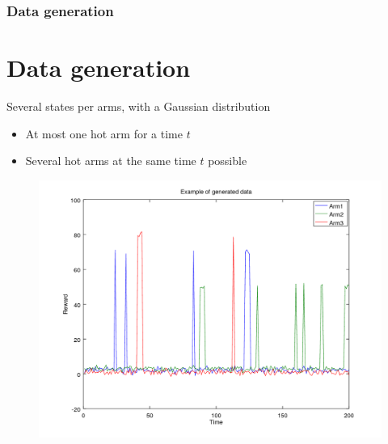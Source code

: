 \documentclass[french]{beamer}
\begin{document}
	\begin{frame}
	\frametitle{Data generation}
	\section{Data generation}
	Several states per arms, with a Gaussian distribution
	\begin{itemize}
		\item At most one hot arm for a time $t$
		\item Several hot arms at the same time $t$ possible
	\end{itemize}
	
	\begin{figure}[h]
			\includegraphics[width=0.7\linewidth]{generated_data_one.png}

		\label{fig:f}
	\end{figure}
	
	
\end{frame}
\end{document}
